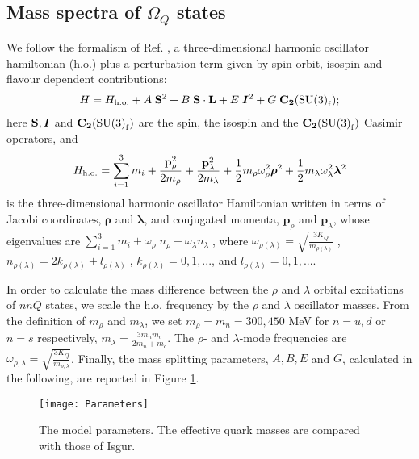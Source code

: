 \documentclass[twocolumn,superscriptaddress,preprintnumbers,nofootinbib]{revtex4}
\begin{document}
\subsection{Mass spectra of $\Omega_{Q}$ states}
\label{secIIB}
We follow the  formalism of Ref. \cite{Santopinto:2018ljf}, a three-dimensional harmonic oscillator hamiltonian (h.o.) 
plus  a perturbation  term given by spin-orbit, isospin and flavour dependent  contributions:
%
\begin{eqnarray}
	H = H_{\rm h.o.}+A\; {\bf S }^2 + B \; {\bf S} \cdot {\bf L} +E\;  \bm{I}^2+G \; {\bf C_2}(\mbox{SU(3)}_{\rm f}) ;%
	\label{MassFormula}
\end{eqnarray}
here ${\bf S}, {\bm I}$ and ${\bf C_2}(\mbox{SU(3)}_{\rm f})$ are the spin, the isospin and 
the  ${\bf C_2}(\mbox{SU(3)}_{\rm f}) $ Casimir operators,
and  
\begin{eqnarray}
 H_{\rm h.o.} =\sum_{i=1}^3m_i + \frac{\mathbf{p}_{\rho}^2}{2 m_{\rho}} 
+ \frac{\mathbf{p}_{\lambda}^2}{2 m_{\lambda}} 
+\frac{1}{2} m_{\rho} \omega^2_{\rho} \boldsymbol{\rho}^2   
+\frac{1}{2}  m_{\lambda} \omega^2_{\lambda} \boldsymbol{\lambda}^2
	\nonumber \\
\label{Hho}
\end{eqnarray}
 is the three-dimensional harmonic oscillator Hamiltonian
written in terms of  Jacobi coordinates, $ \boldsymbol{\rho}$ and  $\boldsymbol{\lambda}$, and 
conjugated momenta, $\mathbf{p}_{\rho}$ and $ \mathbf{p}_{\lambda}$,
whose eigenvalues are $\sum_{i=1}^3m_i + \omega_{\rho}  \; n_{\rho} 
+ \omega_{\lambda} 
n_{\lambda}\;$,
  where  $\omega_{\rho(\lambda)}=\sqrt{\frac{3K_Q}{m_{\rho(\lambda)}}}\;$,
  $ n_{\rho(\lambda)}= 2 k_{\rho(\lambda)}+l_{\rho(\lambda)}\;$, 
  $k_{\rho(\lambda)}=0,1,...$,   and $l_{\rho(\lambda)}=0,1,...$.


In order to calculate the mass difference between the $\rho$ and $\lambda$ orbital excitations of $nnQ$ states, we scale the h.o. frequency by the $\rho$ and $\lambda$  oscillator masses.
From the definition of  $m_{\rho}$  and $m_{\lambda}$, we set  $m_{\rho}=m_n=300, 450$ MeV for $n=u,d$ or $n=s$ respectively, $m_{\lambda}= \frac{3 m_n m_{c}}{2m_n+m_{c}}$. The $\rho$- and $\lambda$-mode frequencies are $\omega_{\rho,\lambda}=\sqrt{\frac{3K_Q}{m_{\rho,\lambda}}}$.
Finally, the mass splitting parameters,  $A,B,E$ and $G$, calculated in the following, are reported in
Figure \ref{parameters}.
\begin{figure}[htbp]
\caption{The model parameters. The effective quark masses are compared with those of Isgur. }
\begin{center}
\texttt{[image: Parameters]}
\label{parameters}
\end{center}
\end{figure} 
\end{document}
